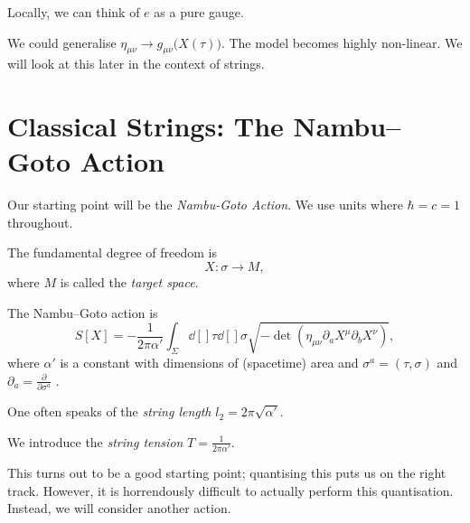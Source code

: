 \begin{leftbar}
  Locally, we can think of $e$ as a pure gauge.
\end{leftbar}

\begin{remark}
  We could generalise $\eta_{\mu\nu} \to g_{\mu\nu}\big(X(\tau)\big)$. 
  The model becomes highly non-linear.
  We will look at this later in the context of strings.
\end{remark}

\section{Classical Strings: The Nambu--Goto Action}%
\label{sec:classical_strings}

Our starting point will be the \emph{Nambu-Goto Action}.
We use units where $\hbar = c = 1$ throughout.
\begin{figure}[tbhp]
  \centering
  \def\svgwidth{0.4\columnwidth}
  
  \caption{}
  \label{fig:l2f2}
\end{figure}
The fundamental degree of freedom is
\begin{equation}
  X \colon \sigma \to M,
\end{equation}
where $M$ is called the \emph{target space}.

\begin{definition}
  The Nambu--Goto action is
  \begin{equation}
    S[X] = -\frac{1}{2\pi \alpha'} \int_{\Sigma} \dd[]{\tau} \dd[]{\sigma} \sqrt{-\det(\eta_{\mu\nu} \partial_{a} X^{\mu} \partial_{b} X^{\nu})},
  \end{equation}
  where $\alpha'$ is a constant with dimensions of (spacetime) area and $\sigma^{a} = (\tau, \sigma)$  and $\partial_{a} = \frac{\partial}{\partial \sigma^{a}}$ .
\end{definition}

\begin{remark}
  One often speaks of the \emph{string length} $l_2 = 2 \pi \sqrt{\alpha'}$.
\end{remark}

\begin{definition}
  We introduce the \emph{string tension} $T = \frac{1}{2 \pi \alpha'}$.
\end{definition}

\begin{leftbar}
  This turns out to be a good starting point; quantising this puts us on the right track. However, it is horrendously difficult to actually perform this quantisation. Instead, we will consider another action.
\end{leftbar}

